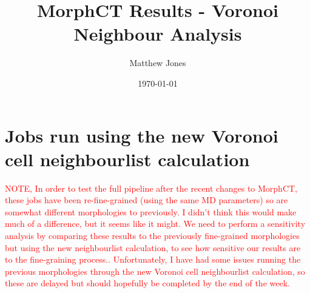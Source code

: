 \documentclass[12pt]{article}
\title{MorphCT Results - Voronoi Neighbour Analysis}
\author{Matthew Jones}
\date{\today}
\begin{document}
\maketitle

\section{Jobs run using the new Voronoi cell neighbourlist calculation}

\textcolor{red}{NOTE, In order to test the full pipeline after the recent changes to MorphCT, these jobs have been re-fine-grained (using the same MD parameters) so are somewhat different morphologies to previously.
I didn't think this would make much of a difference, but it seems like it might.
We need to perform a sensitivity analysis by comparing these results to the previously fine-grained morphologies but using the new neighbourlist calculation, to see how sensitive our results are to the fine-graining process..
Unfortunately, I have had some issues running the previous morphologies through the new Voronoi cell neighbourlist calculation, so these are delayed but should hopefully be completed by the end of the week.}
\end{document}
